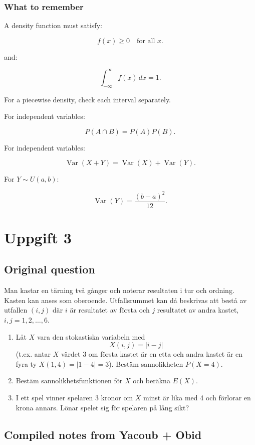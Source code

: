 \documentclass[10pt]{article}
\begin{document}
\subsubsection*{What to remember}
A density function must satisfy:

\[
f(x)\ge 0
\quad \text{for all }x.
\]

and:

\[
\int_{-\infty}^{\infty} f(x)\,dx=1.
\]

For a piecewise density, check each interval separately.

For independent variables:

\[
P(A\cap B)=P(A)P(B).
\]

For independent variables:

\[
\operatorname{Var}(X+Y)
=
\operatorname{Var}(X)
+
\operatorname{Var}(Y).
\]

For \(Y\sim U(a,b)\):

\[
\operatorname{Var}(Y)
=
\frac{(b-a)^2}{12}.
\]

\section*{Uppgift 3}

\subsection*{Original question}
Man kastar en tärning två gånger och noterar resultaten i tur och ordning.
Kasten kan anses som oberoende. Utfallsrummet kan då beskrivas att bestå av
utfallen \((i,j)\) där \(i\) är resultatet av första och \(j\) resultatet
av andra kastet, \(i,j=1,2,\ldots,6\).

\begin{enumerate}[label=\alph*)]
\item
Låt \(X\) vara den stokastiska variabeln med
\[
X(i,j)=|i-j|
\]
(t.ex. antar \(X\) värdet 3 om första kastet är en etta och andra kastet
är en fyra ty \(X(1,4)=|1-4|=3\)).
Bestäm sannolikheten \(P(X=4)\).

\item
Bestäm sannolikhetsfunktionen för \(X\) och beräkna \(E(X)\).

\item
I ett spel vinner spelaren 3 kronor om \(X\) minst är lika med 4 och
förlorar en krona annars. Lönar spelet sig för spelaren på lång sikt?
\end{enumerate}

\subsection*{Compiled notes from Yacoub + Obid}
\end{document}
